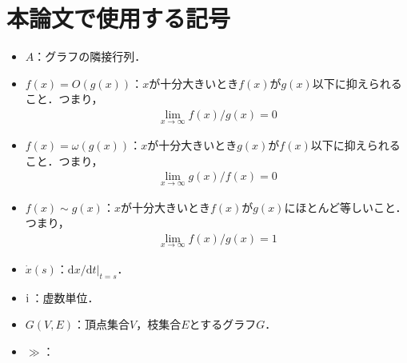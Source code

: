 \documentclass[../main]{subfiles}
\begin{document}
\chapter*{本論文で使用する記号}
\begin{itemize}
    \item 
    $A$：グラフの隣接行列．
    \item
    $f(x)=O(g(x))$：$x$が十分大きいとき$f(x)$が$g(x)$以下に抑えられること．つまり，
    \begin{align*}
        \lim_{x\to\infty}f(x)/g(x)=0
    \end{align*}
    \item
    $f(x)=\omega(g(x))$：$x$が十分大きいとき$g(x)$が$f(x)$以下に抑えられること．つまり，
    \begin{align*}
        \lim_{x\to\infty}g(x)/f(x)=0
    \end{align*}
    \item
    $f(x)\sim g(x)$：$x$が十分大きいとき$f(x)$が$g(x)$にほとんど等しいこと．つまり，
    \begin{align*}
        \lim_{x\to\infty}f(x)/g(x)=1
    \end{align*}    
    \item
    $\dot{x}(s)$：$\mathrm{d}x/\mathrm{d}t|_{t=s}$．
    \item
    ${\mathrm i\,}$：虚数単位．
    \item
    $G(V,E)$：頂点集合$V$，枝集合$E$とするグラフ$G$．
    \item
    $\gg$：
\end{itemize}
\end{document}
